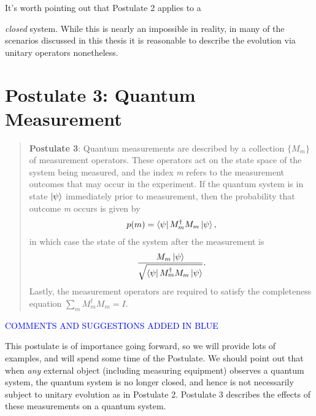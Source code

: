 It's worth pointing out that Postulate 2 applies to a {\emph{closed} system.  While this is nearly an impossible in reality, in many of the scenarios discussed in this thesis it is reasonable to describe the evolution via unitary operators nonetheless.





\pagebreak
\section{Postulate 3: Quantum Measurement}



\begin{quote}
    \textbf{Postulate 3}: Quantum measurements are described by a collection $\{M_m\}$ of measurement operators. These operators act on the state space of the system being measured, and the index {\emph{m}} refers to the measurement outcomes that may occur in the experiment. If the quantum system is in state $\ket{\psi}$ immediately prior to measurement, then the probability that outcome {\emph{m}} occurs is given by 
    \begin{gather*}
        p(m)=\bra{\psi}M_m^\dagger M_m \ket{\psi},
    \end{gather*}
    in which case the state of the system after the measurement is
    \begin{gather*}
        \frac{M_m \ket{\psi}}{\sqrt{\bra{\psi}M_m^\dagger M_m \ket{\psi}}}.
    \end{gather*}
Lastly, the measurement operators are required to satisfy the completeness equation $\sum\limits_m M_m^\dagger M_m =I$.
\end{quote}


\textcolor{blue}{COMMENTS AND SUGGESTIONS ADDED IN BLUE}

This postulate is of importance going forward, so we will provide lots of examples, and will spend some time of the Postulate.  We should point out that when {\emph{any}} external object (including measuring equipment) observes a quantum system, the quantum system is no longer closed, and hence is not necessarily subject to unitary evolution as in Postulate 2. Postulate 3 describes the effects of these measurements on a quantum system. 

}

